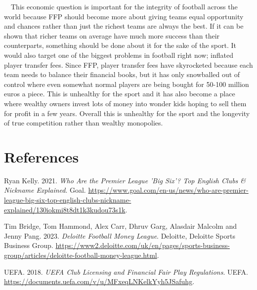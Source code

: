 \documentclass[
  12pt,
]{article}
\newlength{\cslhangindent}
\newenvironment{CSLReferences}[2] %
 {\begin{list}{}{%
  \setlength{\itemindent}{0pt}
  \setlength{\leftmargin}{0pt}
  \setlength{\parsep}{0pt}
  \ifodd #1
   \setlength{\leftmargin}{\cslhangindent}
   \setlength{\itemindent}{-1\cslhangindent}
  \fi
  \setlength{\itemsep}{#2\baselineskip}}}
 {\end{list}}
\begin{document}
~~This economic question is important for the integrity of football
across the world because FFP should become more about giving teams equal
opportunity and chances rather than just the richest teams are always
the best. If it can be shown that richer teams on average have much more
success than their counterparts, something should be done about it for
the sake of the sport. It would also target one of the biggest problems
in football right now; inflated player transfer fees. Since FFP, player
transfer fees have skyrocketed because each team needs to balance their
financial books, but it has only snowballed out of control where even
somewhat normal players are being bought for 50-100 million euros a
piece. This is unhealthy for the sport and it has also become a place
where wealthy owners invest lots of money into wonder kids hoping to
sell them for profit in a few years. Overall this is unhealthy for the
sport and the longevity of true competition rather than wealthy
monopolies.

\newpage

\section*{References}\label{references}

\label{refs}
\begin{CSLReferences}{1}{0}
Ryan Kelly. 2021. \emph{Who Are the Premier League 'Big Six'? Top
English Clubs \& Nickname Explained}. Goal.
\url{https://www.goal.com/en-us/news/who-are-premier-league-big-six-top-english-clubs-nickname-explained/130iokmi8t8dt1k3kudou73s1k}.

Tim Bridge, Tom Hammond, Alex Carr, Dhruv Garg, Alasdair Malcolm and
Jenny Pang. 2023. \emph{Deloitte Football Money League}. Deloitte,
Deloitte Sports Business Group.
\url{https://www2.deloitte.com/uk/en/pages/sports-business-group/articles/deloitte-football-money-league.html}.

UEFA. 2018. \emph{UEFA Club Licensing and Financial Fair Play
Regulations}. UEFA.
\url{https://documents.uefa.com/v/u/MFxeqLNKelkYyh5JSafuhg}.

\end{CSLReferences}
\end{document}
